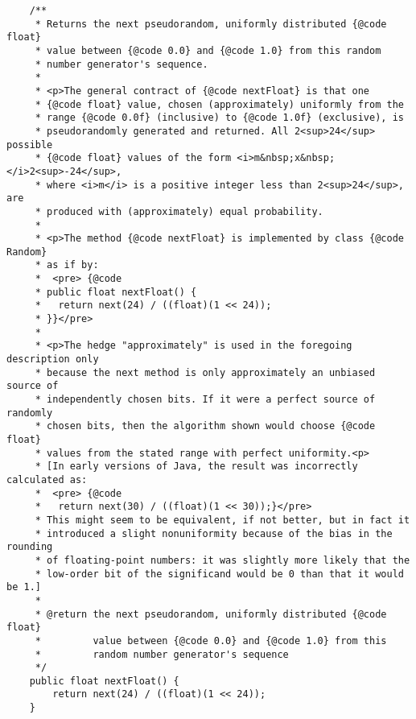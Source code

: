 \documentclass[12pt,a4paper,twoside,openright,titlepage,final]{article}
\begin{document}
\begin{verbatim}
    /**
     * Returns the next pseudorandom, uniformly distributed {@code float}
     * value between {@code 0.0} and {@code 1.0} from this random
     * number generator's sequence.
     *
     * <p>The general contract of {@code nextFloat} is that one
     * {@code float} value, chosen (approximately) uniformly from the
     * range {@code 0.0f} (inclusive) to {@code 1.0f} (exclusive), is
     * pseudorandomly generated and returned. All 2<sup>24</sup> possible
     * {@code float} values of the form <i>m&nbsp;x&nbsp;</i>2<sup>-24</sup>,
     * where <i>m</i> is a positive integer less than 2<sup>24</sup>, are
     * produced with (approximately) equal probability.
     *
     * <p>The method {@code nextFloat} is implemented by class {@code Random}
     * as if by:
     *  <pre> {@code
     * public float nextFloat() {
     *   return next(24) / ((float)(1 << 24));
     * }}</pre>
     *
     * <p>The hedge "approximately" is used in the foregoing description only
     * because the next method is only approximately an unbiased source of
     * independently chosen bits. If it were a perfect source of randomly
     * chosen bits, then the algorithm shown would choose {@code float}
     * values from the stated range with perfect uniformity.<p>
     * [In early versions of Java, the result was incorrectly calculated as:
     *  <pre> {@code
     *   return next(30) / ((float)(1 << 30));}</pre>
     * This might seem to be equivalent, if not better, but in fact it
     * introduced a slight nonuniformity because of the bias in the rounding
     * of floating-point numbers: it was slightly more likely that the
     * low-order bit of the significand would be 0 than that it would be 1.]
     *
     * @return the next pseudorandom, uniformly distributed {@code float}
     *         value between {@code 0.0} and {@code 1.0} from this
     *         random number generator's sequence
     */
    public float nextFloat() {
        return next(24) / ((float)(1 << 24));
    }


\end{verbatim}
\end{document}
